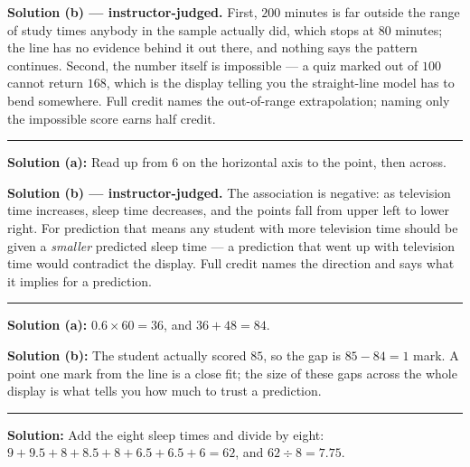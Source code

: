 \documentclass[12pt]{article}
\begin{document}
\noindent\textbf{Solution (b) --- instructor-judged.} First, $200$ minutes is far outside the range
of study times anybody in the sample actually did, which stops at $80$ minutes; the line has no
evidence behind it out there, and nothing says the pattern continues. Second, the number itself is
impossible --- a quiz marked out of $100$ cannot return $168$, which is the display telling you the
straight-line model has to bend somewhere. Full credit names the out-of-range extrapolation; naming
only the impossible score earns half credit.

\vspace{0.15cm}\noindent\rule{\linewidth}{0.2pt}


\textbf{Solution (a):} \quad Read up from $6$ on the horizontal axis to the point, then across.

\noindent\textbf{Solution (b) --- instructor-judged.} The association is negative: as television
time increases, sleep time decreases, and the points fall from upper left to lower right. For
prediction that means any student with more television time should be given a \emph{smaller}
predicted sleep time --- a prediction that went up with television time would contradict the
display. Full credit names the direction and says what it implies for a prediction.

\vspace{0.15cm}\noindent\rule{\linewidth}{0.2pt}


\textbf{Solution (a):} \quad $0.6 \times 60 = 36$, and $36 + 48 = 84$. 

\noindent\textbf{Solution (b):} \quad The student actually scored $85$, so the gap is
$85 - 84 = 1$ mark. A point one mark from the line is a close fit; the size of these gaps across the
whole display is what tells you how much to trust a prediction. 

\vspace{0.15cm}\noindent\rule{\linewidth}{0.2pt}


\textbf{Solution:} \quad Add the eight sleep times and divide by eight:
$9 + 9.5 + 8 + 8.5 + 8 + 6.5 + 6.5 + 6 = 62$, and $62 \div 8 = 7.75$.
\end{document}
